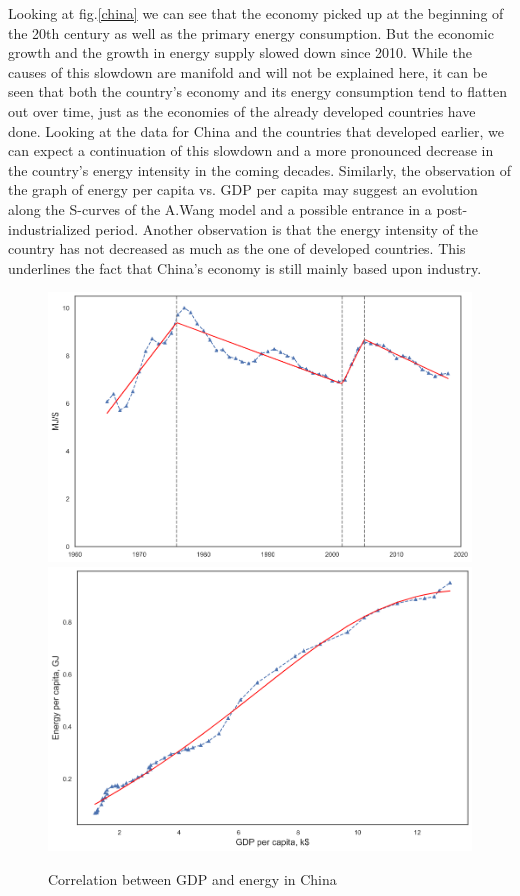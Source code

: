 \documentclass[conference]{IEEEtran}
\begin{document}
Looking at fig.\ref{china} we can see that the economy picked up at the beginning of the 20th century as well as the primary energy consumption. But the economic growth and the growth in energy supply slowed down since 2010.  While the causes of this slowdown are manifold and will not be explained here, it can be seen that both the country's economy and its energy consumption tend to flatten out over time, just as the economies of the already developed countries have done.
Looking at the data for China and the countries that developed earlier, we can expect a continuation of this slowdown and a more pronounced decrease in the country's energy intensity in the coming decades. Similarly, the observation of the graph of energy per capita vs. GDP per capita may suggest an evolution along the S-curves of the A.Wang model and a possible entrance in a post-industrialized period. 
Another observation is that the energy intensity of the country has not decreased as much as the one of developed countries. This underlines the fact that China’s economy is still mainly based upon industry. 
\begin{figure}
    \centering
    \includegraphics[scale=0.225]{energy-intensity-time-ch.png}
    \includegraphics[scale=0.224]{energyc-gdpc-chn.png}
    \caption{Correlation between GDP and energy in China}
    \label{fig:my_label}
\end{figure}
\end{document}
